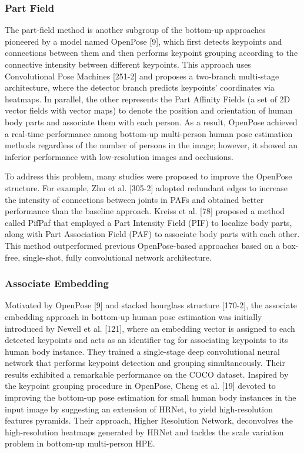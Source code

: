 \subsubsection{Part Field}
 
The part-field method is another subgroup of the bottom-up approaches pioneered by a model named OpenPose [9], which first detects keypoints and connections between them and then performs keypoint grouping according to the connective intensity between different keypoints. This approach uses Convolutional Pose Machines [251-2] and proposes a two-branch multi-stage architecture, where the detector branch predicts keypoints’ coordinates via heatmaps. In parallel, the other represents the Part Affinity Fields (a set of 2D vector fields with vector maps) to denote the position and orientation of human body parts and associate them with each person. As a result, OpenPose achieved a real-time performance among bottom-up multi-person human pose estimation methods regardless of the number of persons in the image; however, it showed an inferior performance with low-resolution images and occlusions. 

To address this problem, many studies were proposed to improve the OpenPose structure. For example, Zhu et al. [305-2] adopted redundant edges to increase the intensity of connections between joints in PAFs and obtained better performance than the baseline approach. Kreiss et al. [78] proposed a method called PifPaf that employed a Part Intensity Field (PIF) to localize body parts, along with Part Association Field (PAF) to associate body parts with each other. This method outperformed previous OpenPose-based approaches based on a box-free, single-shot, fully convolutional network architecture. 

\subsubsection{Associate Embedding} 

Motivated by OpenPose [9] and stacked hourglass structure [170-2], the associate embedding approach in bottom-up human pose estimation was initially introduced by Newell et al. [121], where an embedding vector is assigned to each detected keypoints and acts as an identifier tag for associating keypoints to its human body instance. They trained a single-stage deep convolutional neural network that performs keypoint detection and grouping simultaneously. Their results exhibited a remarkable performance on the COCO dataset. Inspired by the keypoint grouping procedure in OpenPose, Cheng et al. [19] devoted to improving the bottom-up pose estimation for small human body instances in the input image by suggesting an extension of HRNet, to yield high-resolution features pyramids. Their approach, Higher Resolution Network, deconvolves the high-resolution heatmaps generated by HRNet and tackles the scale variation problem in bottom-up multi-person HPE. 

